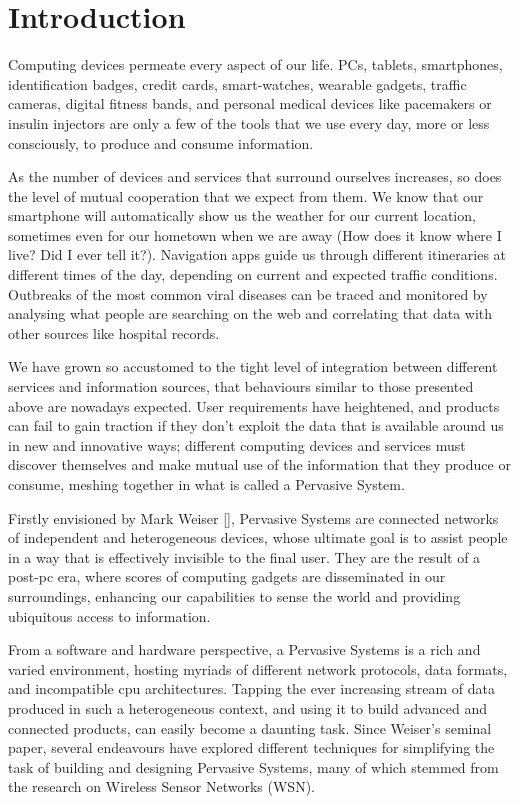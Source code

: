 \chapter{Introduction}

Computing devices permeate every aspect of our life. PCs, tablets, smartphones, identification badges, credit cards, smart-watches, wearable gadgets, traffic cameras, digital fitness bands, and personal medical devices like pacemakers or insulin injectors are only a few of the tools that we use every day, more or less consciously, to produce and consume information.

As the number of devices and services that surround ourselves increases, so does the level of mutual cooperation that we expect from them. We know that our smartphone will automatically show us the weather for our current location, sometimes even for our hometown when we are away (How does it know where I live? Did I ever tell it?). Navigation apps guide us through different itineraries at different times of the day, depending on current and expected traffic conditions. Outbreaks of the most common viral diseases can be traced and monitored by analysing what people are searching on the web and correlating that data with other sources like hospital records.

We have grown so accustomed to the tight level of integration between different services and information sources, that behaviours similar to those presented above are nowadays expected. User requirements have heightened, and products can fail to gain traction if they don’t exploit the data that is available around us in new and innovative ways; different computing devices and services must discover themselves and make mutual use of the information that they produce or consume, meshing together in what is called a Pervasive System.

Firstly envisioned by Mark Weiser [], Pervasive Systems are connected networks of independent and heterogeneous devices, whose ultimate goal is to assist people in a way that is effectively invisible to the final user. They are the result of a post-pc era, where scores of computing gadgets are disseminated in our surroundings, enhancing our capabilities to sense the world and providing ubiquitous access to information.

From a software and hardware perspective, a Pervasive Systems is a rich and varied environment, hosting myriads of different network protocols, data formats, and incompatible cpu architectures. Tapping the ever increasing stream of data produced in such a heterogeneous context, and using it to build advanced and connected products, can easily become a daunting task. Since Weiser’s seminal paper, several endeavours have explored different techniques for simplifying the task of building and designing Pervasive Systems, many of which stemmed from the research on Wireless Sensor Networks (WSN).

